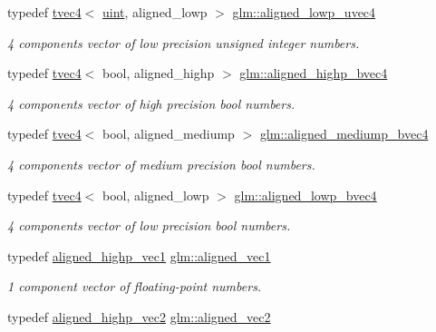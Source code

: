 \begin{DoxyCompactItemize}
typedef \mbox{\hyperlink{structglm_1_1tvec4}{tvec4}}$<$ \mbox{\hyperlink{group__core__precision_ga4fd29415871152bfb5abd588334147c8}{uint}}, aligned\+\_\+lowp $>$ \mbox{\hyperlink{group__gtc__type__aligned_gaddd52f9fd4fe29220ad183043a7d1ddd}{glm\+::aligned\+\_\+lowp\+\_\+uvec4}}
\begin{DoxyCompactList}\small\item\em 4 components vector of low precision unsigned integer numbers. \end{DoxyCompactList}\item 
typedef \mbox{\hyperlink{structglm_1_1tvec4}{tvec4}}$<$ bool, aligned\+\_\+highp $>$ \mbox{\hyperlink{group__gtc__type__aligned_ga2e41bbaacd4df8babd91b4e2f21cb8dd}{glm\+::aligned\+\_\+highp\+\_\+bvec4}}
\begin{DoxyCompactList}\small\item\em 4 components vector of high precision bool numbers. \end{DoxyCompactList}\item 
typedef \mbox{\hyperlink{structglm_1_1tvec4}{tvec4}}$<$ bool, aligned\+\_\+mediump $>$ \mbox{\hyperlink{group__gtc__type__aligned_ga2125d53e043f27687b7a40d14bd05ca0}{glm\+::aligned\+\_\+mediump\+\_\+bvec4}}
\begin{DoxyCompactList}\small\item\em 4 components vector of medium precision bool numbers. \end{DoxyCompactList}\item 
typedef \mbox{\hyperlink{structglm_1_1tvec4}{tvec4}}$<$ bool, aligned\+\_\+lowp $>$ \mbox{\hyperlink{group__gtc__type__aligned_ga9de756b9d2ebdf5495b5d1477d124571}{glm\+::aligned\+\_\+lowp\+\_\+bvec4}}
\begin{DoxyCompactList}\small\item\em 4 components vector of low precision bool numbers. \end{DoxyCompactList}\item 
typedef \mbox{\hyperlink{group__gtc__type__aligned_ga5d83af334bd222c85f73bf37eecf4768}{aligned\+\_\+highp\+\_\+vec1}} \mbox{\hyperlink{group__gtc__type__aligned_ga8cf75c112dfa39264b7ef65c2ed6b3c4}{glm\+::aligned\+\_\+vec1}}
\begin{DoxyCompactList}\small\item\em 1 component vector of floating-\/point numbers. \end{DoxyCompactList}\item 
typedef \mbox{\hyperlink{group__gtc__type__aligned_ga5873b18cca2602c92bb077e663e29bbd}{aligned\+\_\+highp\+\_\+vec2}} \mbox{\hyperlink{group__gtc__type__aligned_ga8f4a38f220c72d218dbdc7bc1d06a1a2}{glm\+::aligned\+\_\+vec2}}

\end{DoxyCompactItemize}
